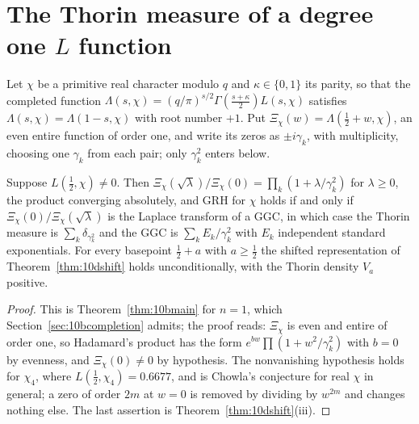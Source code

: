 \section{The Thorin measure of a degree one \texorpdfstring{$L$}{L} function}\label{sec:gl1thorin}

Let $\chi$ be a primitive real character modulo $q$ and $\kappa\in\{0,1\}$ its parity, so that the completed function $\Lambda(s,\chi)=(q/\pi)^{s/2}\Gamma(\frac{s+\kappa}2)L(s,\chi)$ satisfies $\Lambda(s,\chi)=\Lambda(1-s,\chi)$ with root number $+1$. Put $\Xi_\chi(w)=\Lambda(\frac12+w,\chi)$, an even entire function of order one, and write its zeros as $\pm i\gamma_k$, with multiplicity, choosing one $\gamma_k$ from each pair; only $\gamma_k^2$ enters below.

\begin{theorem}\label{thm:gl1thorin}
Suppose $L(\frac12,\chi)\ne0$. Then $\Xi_\chi(\sqrt\lambda)/\Xi_\chi(0)=\prod_k(1+\lambda/\gamma_k^2)$ for $\lambda\ge0$, the product converging absolutely, and GRH for $\chi$ holds if and only if $\Xi_\chi(0)/\Xi_\chi(\sqrt\lambda)$ is the Laplace transform of a GGC, in which case the Thorin measure is $\sum_k\delta_{\gamma_k^2}$ and the GGC is $\sum_kE_k/\gamma_k^2$ with $E_k$ independent standard exponentials. For every basepoint $\frac12+a$ with $a\ge\frac12$ the shifted representation of Theorem~\ref{thm:10dshift} holds unconditionally, with the Thorin density $V_a$ positive.
\end{theorem}

\begin{proof}
This is Theorem~\ref{thm:10bmain} for $n=1$, which Section~\ref{sec:10bcompletion} admits; the proof reads: $\Xi_\chi$ is even and entire of order one, so Hadamard's product has the form $e^{bw}\prod(1+w^2/\gamma_k^2)$ with $b=0$ by evenness, and $\Xi_\chi(0)\ne0$ by hypothesis. The nonvanishing hypothesis holds for $\chi_4$, where $L(\frac12,\chi_4)=0.6677$, and is Chowla's conjecture for real $\chi$ in general; a zero of order $2m$ at $w=0$ is removed by dividing by $w^{2m}$ and changes nothing else. The last assertion is Theorem~\ref{thm:10dshift}(iii).
\end{proof}

